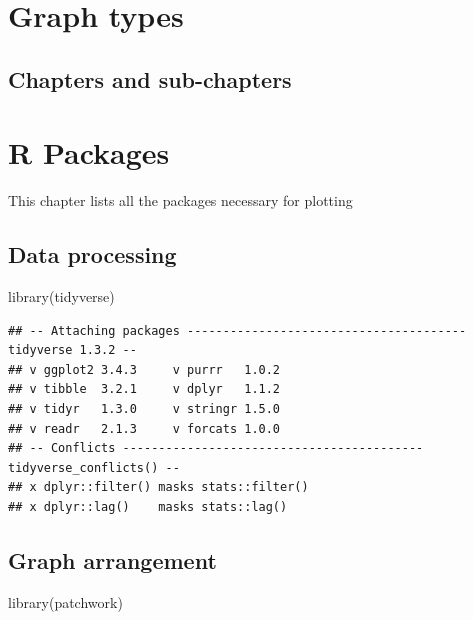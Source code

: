 \documentclass[
]{book}
\newenvironment{Shaded}{\begin{snugshade}}{\end{snugshade}}
\newcommand{\FunctionTok}[1]{\textcolor[rgb]{0.00,0.00,0.00}{#1}}
\newcommand{\NormalTok}[1]{#1}
\begin{document}
\hypertarget{cross}{%
\chapter{Graph types}\label{cross}}

\hypertarget{chapters-and-sub-chapters}{%
\section{Chapters and sub-chapters}\label{chapters-and-sub-chapters}}

\hypertarget{r-packages}{%
\chapter{R Packages}\label{r-packages}}

This chapter lists all the packages necessary for plotting

\hypertarget{data-processing}{%
\section{Data processing}\label{data-processing}}

\begin{Shaded}
\begin{Highlighting}[]
\FunctionTok{library}\NormalTok{(tidyverse)}
\end{Highlighting}
\end{Shaded}

\begin{verbatim}
## -- Attaching packages --------------------------------------- tidyverse 1.3.2 --
## v ggplot2 3.4.3     v purrr   1.0.2
## v tibble  3.2.1     v dplyr   1.1.2
## v tidyr   1.3.0     v stringr 1.5.0
## v readr   2.1.3     v forcats 1.0.0
## -- Conflicts ------------------------------------------ tidyverse_conflicts() --
## x dplyr::filter() masks stats::filter()
## x dplyr::lag()    masks stats::lag()
\end{verbatim}

\hypertarget{graph-arrangement}{%
\section{Graph arrangement}\label{graph-arrangement}}

\begin{Shaded}
\begin{Highlighting}[]
\FunctionTok{library}\NormalTok{(patchwork)}
\end{Highlighting}
\end{Shaded}
\end{document}

